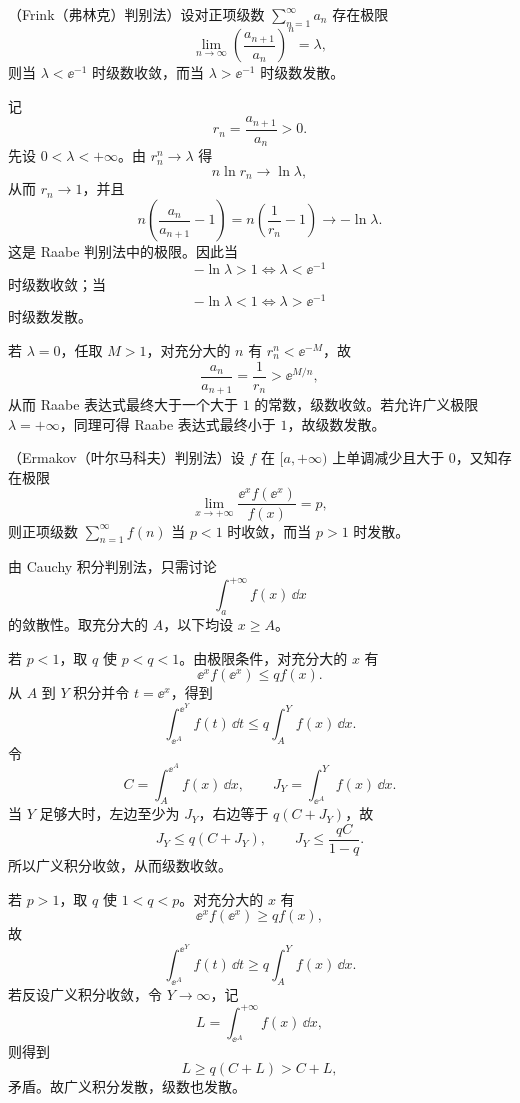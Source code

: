 \begin{xreferenceproblem}[5]
（Frink（弗林克）判别法）设对正项级数 $\sum_{n=1}^{\infty}a_n$ 存在极限
\[
\lim_{n\to\infty}\left(\frac{a_{n+1}}{a_n}\right)^n=\lambda,
\]
则当 $\lambda<\ee^{-1}$ 时级数收敛，而当 $\lambda>\ee^{-1}$ 时级数发散。
\end{xreferenceproblem}
\begin{xsolution}
记
\[
 r_n=\frac{a_{n+1}}{a_n}>0.
\]
先设 $0<\lambda<+\infty$。由 $r_n^n\to\lambda$ 得
\[
 n\ln r_n\to\ln\lambda,
\]
从而 $r_n\to1$，并且
\[
 n\left(\frac{a_n}{a_{n+1}}-1\right)
 =n\left(\frac1{r_n}-1\right)
 \longrightarrow-\ln\lambda.
\]
这是 Raabe 判别法中的极限。因此当
\[
 -\ln\lambda>1\iff\lambda<\ee^{-1}
\]
时级数收敛；当
\[
 -\ln\lambda<1\iff\lambda>\ee^{-1}
\]
时级数发散。

若 $\lambda=0$，任取 $M>1$，对充分大的 $n$ 有 $r_n^n<\ee^{-M}$，故
\[
 \frac{a_n}{a_{n+1}}=\frac1{r_n}>\ee^{M/n},
\]
从而 Raabe 表达式最终大于一个大于 $1$ 的常数，级数收敛。若允许广义极限 $\lambda=+\infty$，同理可得 Raabe 表达式最终小于 $1$，故级数发散。
\end{xsolution}


\begin{xreferenceproblem}[6]
（Ermakov（叶尔马科夫）判别法）设 $f$ 在 $[a,+\infty)$ 上单调减少且大于 0，又知存在极限
\[
\lim_{x\to+\infty}\frac{\ee^xf(\ee^x)}{f(x)}=p,
\]
则正项级数 $\sum_{n=1}^{\infty}f(n)$ 当 $p<1$ 时收敛，而当 $p>1$ 时发散。
\end{xreferenceproblem}
\begin{xsolution}
由 Cauchy 积分判别法，只需讨论
\[
 \int_a^{+\infty}f(x)\,\dd x
\]
的敛散性。取充分大的 $A$，以下均设 $x\geq A$。

若 $p<1$，取 $q$ 使 $p<q<1$。由极限条件，对充分大的 $x$ 有
\[
 \ee^xf(\ee^x)\leq qf(x).
\]
从 $A$ 到 $Y$ 积分并令 $t=\ee^x$，得到
\[
 \int_{\ee^A}^{\ee^Y}f(t)\,\dd t
 \leq q\int_A^Y f(x)\,\dd x.
\]
令
\[
 C=\int_A^{\ee^A}f(x)\,\dd x,
 \qquad
 J_Y=\int_{\ee^A}^{Y}f(x)\,\dd x.
\]
当 $Y$ 足够大时，左边至少为 $J_Y$，右边等于 $q(C+J_Y)$，故
\[
 J_Y\leq q(C+J_Y),
 \qquad
 J_Y\leq\frac{qC}{1-q}.
\]
所以广义积分收敛，从而级数收敛。

若 $p>1$，取 $q$ 使 $1<q<p$。对充分大的 $x$ 有
\[
 \ee^xf(\ee^x)\geq qf(x),
\]
故
\[
 \int_{\ee^A}^{\ee^Y}f(t)\,\dd t
 \geq q\int_A^Y f(x)\,\dd x.
\]
若反设广义积分收敛，令 $Y\to\infty$，记
\[
 L=\int_{\ee^A}^{+\infty}f(x)\,\dd x,
\]
则得到
\[
 L\geq q(C+L)>C+L,
\]
矛盾。故广义积分发散，级数也发散。
\end{xsolution}


